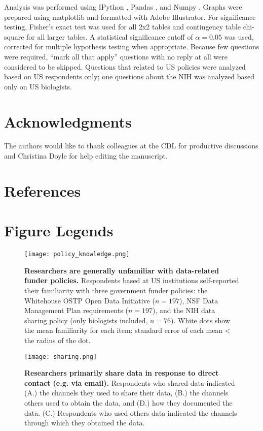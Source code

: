 \documentclass[10pt]{article}
\begin{document}
Analysis was performed using IPython \cite{perez_ipython:_2007}, Pandas \cite{mckinney_data_2010}, and Numpy \cite{van_der_walt_numpy_2011}.
Graphs were prepared using matplotlib \cite{hunter_matplotlib:_2007} and formatted with Adobe Illustrator.
For significance testing, Fisher's exact test was used for all 2x2 tables and contingency table chi-square for all larger tables.
A statistical significance cutoff of $\alpha=0.05$ was used, corrected for multiple hypothesis testing when appropriate.
Because few questions were required,  ``mark all that apply'' questions with no reply at all were considered to be skipped.
Questions that related to US policies were analyzed based on US respondents only; one questions about the NIH was analyzed based only on US biologists.

\section*{Acknowledgments}
The authors would like to thank colleagues at the CDL for productive discussions and Christina Doyle for help editing the manuscript.


\section*{References}


\section*{Figure Legends}

\begin{figure}[!ht]
\begin{center}
\texttt{[image: policy\_knowledge.png]}
\end{center}
\caption{
{\bf Researchers are generally unfamiliar with data-related funder policies.}
Respondents based at US institutions self-reported their familiarity with three government funder policies: the Whitehouse OSTP Open Data Initiative ($n=197$), NSF Data Management Plan requirements ($n=197$), and the NIH data sharing policy (only biologists included, $n=76$). 
White dots show the mean familiarity for each item; standard error of each mean < the radius of the dot.
}
\label{fig:policy_knowledge}
\end{figure}


\begin{figure}[!ht]
\begin{center}
\texttt{[image: sharing.png]}
\end{center}
\caption{
{\bf Researchers primarily share data in response to direct contact (e.g. via email).}
Respondents who shared data indicated (A.) the channels they used to share their data, (B.) the channels others used to obtain the data, and (D.) how they documented the data.
(C.) Respondents who used others data indicated the channels through which they obtained the data.
}
\label{fig:sharing}
\end{figure}
\end{document}
